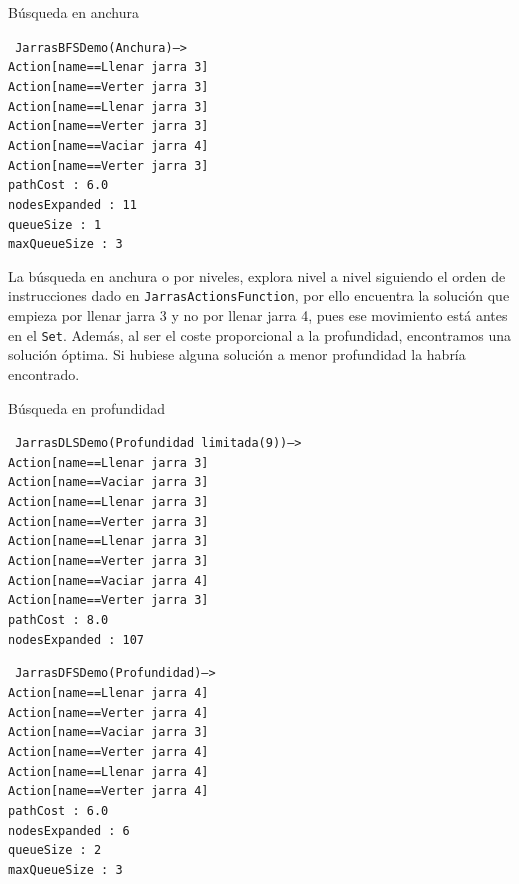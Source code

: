 \documentclass[11pt, a4paper, spanish, openright, twoside]{book}
\begin{document}
\begin{section}{Búsqueda en anchura}
	
\texttt{
	JarrasBFSDemo(Anchura)--> \\
	Action[name==Llenar jarra 3]		\\
	Action[name==Verter jarra 3] 		\\ 
	Action[name==Llenar jarra 3]		\\
	Action[name==Verter jarra 3]		\\
	Action[name==Vaciar jarra 4]		\\
	Action[name==Verter jarra 3]		\\
	pathCost : 6.0					\\
	nodesExpanded : 11			\\
	queueSize : 1					\\
	maxQueueSize : 3				
}

La búsqueda en anchura o por niveles, explora nivel a nivel siguiendo el orden de instrucciones dado en \texttt{JarrasActionsFunction}, por ello encuentra la solución que 
empieza por llenar jarra 3 y no por llenar jarra 4, pues ese movimiento está antes en el \texttt{Set}. Además, al ser el coste proporcional a la profundidad, encontramos una solución óptima.
 Si hubiese alguna solución a menor profundidad la habría encontrado.

\end{section}

\begin{section}{Búsqueda en profundidad}

\texttt{
	JarrasDLSDemo(Profundidad limitada(9))-->	\\
	Action[name==Llenar jarra 3]		\\
	Action[name==Vaciar jarra 3]		\\
	Action[name==Llenar jarra 3]		\\
	Action[name==Verter jarra 3]		\\
	Action[name==Llenar jarra 3]		\\
	Action[name==Verter jarra 3]		\\
	Action[name==Vaciar jarra 4]		\\
	Action[name==Verter jarra 3]		\\
	pathCost : 8.0					\\
	nodesExpanded : 107			\\
}

\texttt{
	JarrasDFSDemo(Profundidad)-->	\\
	Action[name==Llenar jarra 4]		\\
	Action[name==Verter jarra 4]		\\
	Action[name==Vaciar jarra 3]		\\
	Action[name==Verter jarra 4]		\\
	Action[name==Llenar jarra 4]		\\
	Action[name==Verter jarra 4]		\\
	pathCost : 6.0					\\
	nodesExpanded : 6				\\
	queueSize : 2					\\
	maxQueueSize : 3				
}

\end{section}
\end{document}
